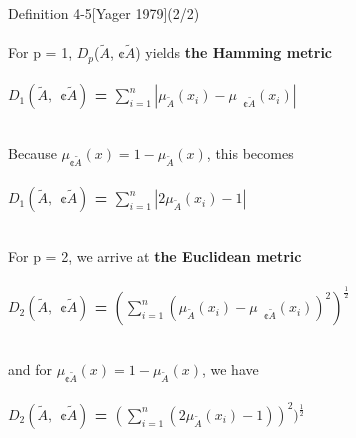\documentclass{beamer}
\begin{document}
\begin{CJK*}{UTF8}{bsmi}

\begin{frame}
\frametitle{}

\begin{block}{Definition 4-5[Yager 1979](2/2)}
~\\
~\\
For p = 1, $D_{p}$($\tilde{A}$, ¢$\tilde{A}$) yields \textbf{the Hamming metric}\\
~\\
\centering\textbf{$D_{1}(\tilde{A},~~¢\tilde{A})$ = $\sum_{i=1}^n |\mu_{\tilde{A}}( x_{i})- \mu_{~~~¢\tilde{A}}( x_{i} )| $}\\
~\\
\raggedright Because $\mu_{\textbf{¢}\tilde{A}}( x) = 1 - \mu_{\tilde{A}}( x)$, this becomes\\
~\\
\centering\textbf{$D_{1}(\tilde{A},~~¢\tilde{A})$ = $\sum_{i=1}^n |2\mu_{\tilde{A}}( x_{i})- 1| $}\\
~\\
\raggedright For p = 2, we arrive at \textbf{the Euclidean metric}\\
~\\
\centering\textbf{$D_{2}(\tilde{A},~~¢\tilde{A})$ = $(\sum_{i=1}^n (\mu_{\tilde{A}}( x_{i})- \mu_{~~~¢\tilde{A}}( x_{i} ))^2 )^ \frac{1}{2} $}\\
~\\
\raggedright and for $\mu_{\textbf{¢}\tilde{A}}( x) = 1 - \mu_{\tilde{A}}( x)$, we have\\
~\\
\centering\textbf{$D_{2}(\tilde{A},~~¢\tilde{A})$ = $(\sum_{i=1}^n (2\mu_{\tilde{A}}( x_{i})- 1 ))^2 )^ \frac{1}{2} $}\\
~\\
\end{block}

\end{frame}


\begin{frame}
\frametitle{}


\end{frame}
\end{CJK*}
\end{document}
